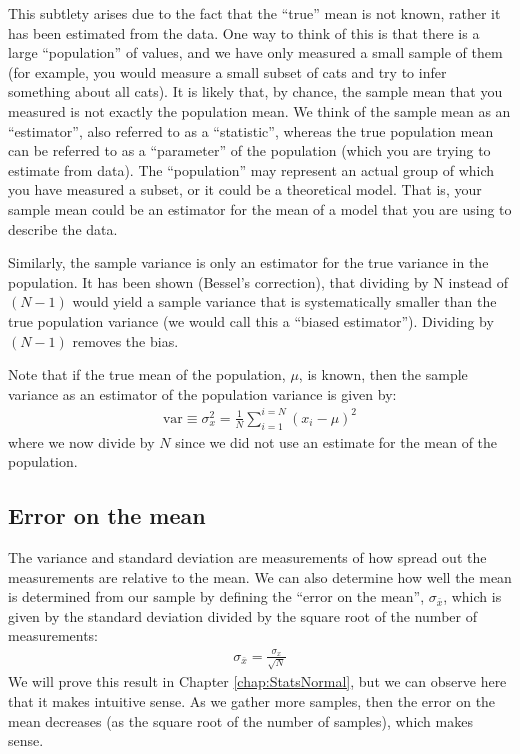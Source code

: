 This subtlety arises due to the fact that the ``true'' mean is not known, rather it has been estimated from the data. One way to think of this is that there is a large ``population'' of values, and we have only measured a small sample of them (for example, you would measure a small subset of cats and try to infer something about all cats). It is likely that, by chance, the sample mean that you measured is not exactly the population mean. We think of the sample mean as an ``estimator'', also referred to as a ``statistic'', whereas the true population mean can be referred to as a ``parameter'' of the population (which you are trying to estimate from data). The ``population'' may represent an actual group of which you have measured a subset, or it could be a theoretical model. That is, your sample mean could be an estimator for the mean of a model that you are using to describe the data.

Similarly, the sample variance is only an estimator for the true variance in the population. It has been shown (Bessel's correction), that dividing by N instead of $(N-1)$ would yield a sample variance that is systematically smaller than the true population variance (we would call this a ``biased estimator''). Dividing by $(N-1)$ removes the bias. 

Note that if the true mean of the population, $\mu$, is known, then the sample variance as an estimator of the population variance is given by:
\begin{align}
 \text{var}\equiv \sigma_x^2 = \frac{1}{N} \sum_{i=1}^{i=N} (x_i-\mu)^2 
\end{align}
where we now divide by $N$ since we did not use an estimate for the mean of the population.
 
\subsection{Error on the mean} 
The variance and standard deviation are measurements of how spread out the measurements are relative to the mean. We can also determine how well the mean is determined from our sample by defining the ``error on the mean'', $\sigma_{\bar x}$, which is given by the standard deviation divided by the square root of the number of measurements:
\begin{align}
 \sigma_{\bar x}= \frac{\sigma_x}{\sqrt N}
\end{align}
We will prove this result in Chapter \ref{chap:StatsNormal}, but we can observe here that it makes intuitive sense. As we gather more samples, then the error on the mean decreases (as the square root of the number of samples), which makes sense. 
 
